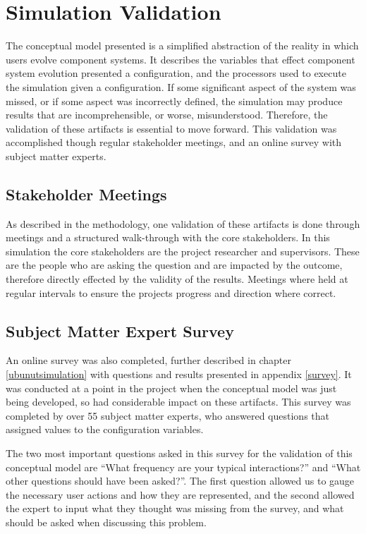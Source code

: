 \section{Simulation Validation}
The conceptual model presented is a simplified abstraction of the reality in which users evolve component systems.
It describes the variables that effect component system evolution presented a configuration,
and the processors used to execute the simulation given a configuration.
If some significant aspect of the system was missed, or if some aspect was incorrectly defined, the simulation may produce results that are incomprehensible,
or worse, misunderstood.
Therefore, the validation of these artifacts is essential to move forward. 
This validation was accomplished though regular stakeholder meetings, and an online survey with subject matter experts.

\subsection{Stakeholder Meetings}
As described in the methodology, one validation of these artifacts is done through meetings and a structured walk-through with the core stakeholders.
In this simulation the core stakeholders are the project researcher and supervisors.
These are the people who are asking the question and are impacted by the outcome, therefore directly effected by the validity of the results.
Meetings where held at regular intervals to ensure the projects progress and direction where correct.

\subsection{Subject Matter Expert Survey}
An online survey was also completed, further described in chapter \ref{ubunutsimulation} with questions and results presented in appendix \ref{survey}.
It was conducted at a point in the project when the conceptual model was just being developed, so had considerable impact on these artifacts.
This survey was completed by over 55 subject matter experts, who answered questions that assigned values to the configuration variables.

The two most important questions asked in this survey for the validation of this conceptual model are 
``What frequency are your typical interactions?'' and ``What other questions should have been asked?''.
The first question allowed us to gauge the necessary user actions and how they are represented,
and the second allowed the expert to input what they thought was missing from the survey, and what should be asked when discussing this problem.

